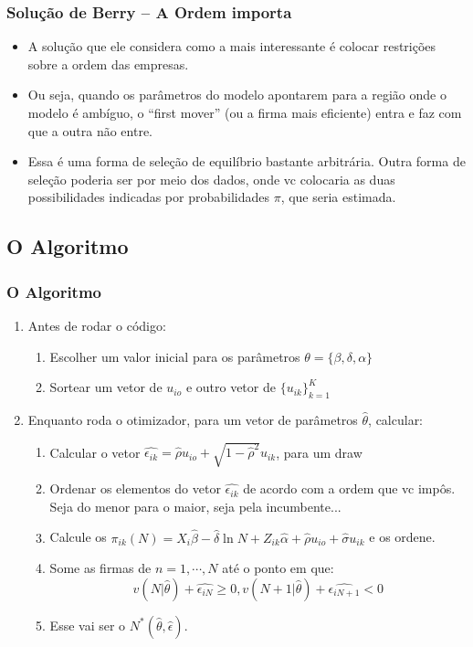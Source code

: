 \documentclass{beamer}
\begin{document}
\begin{frame}[fragile]\frametitle{Solução de Berry -- A Ordem importa}
    
    \begin{itemize}
        \item A solução que ele considera como a mais interessante é colocar restrições sobre a ordem das empresas.
        \item Ou seja, quando os parâmetros do modelo apontarem para a região onde o modelo é ambíguo, o ``first mover'' (ou a firma mais eficiente) entra e faz com que a outra não entre.
        \item Essa é uma forma de seleção de equilíbrio bastante arbitrária. Outra forma de seleção poderia ser por meio dos dados, onde vc colocaria as duas possibilidades indicadas por probabilidades $\pi$, que seria estimada.
    \end{itemize}


\end{frame}

\subsection{O Algoritmo}

\begin{frame}[fragile]\frametitle{O Algoritmo}
    
    \begin{enumerate}
        \item Antes de rodar o código:
        \begin{enumerate}
            \item Escolher um valor inicial para os parâmetros $\theta=\{\beta, \delta, \alpha\}$
            \item Sortear um vetor de $u_{io}$ e outro vetor de $\{u_{ik}\}_{k=1}^{K}$
        \end{enumerate}
        \item Enquanto roda o otimizador, para um vetor de parâmetros $\hat{\theta}$, calcular:
        \begin{enumerate}
            \item Calcular o vetor $\hat{\epsilon_{ik}}=\hat{\rho} u_{io}+ \sqrt{1-\hat{\rho}^2} u_{ik}$, para um draw
            \item Ordenar os elementos do vetor $\hat{\epsilon_{ik}}$ de acordo com a ordem que vc impôs. Seja do menor para o maior, seja pela incumbente...
            \item Calcule os $\pi_{ik}(N)=X_{i}\hat{\beta} - \hat{\delta} \ln{N} + Z_{ik} \hat{\alpha} +\hat{\rho} u_{io} + \hat{\sigma} u_{ik}$ e os ordene. 
            \item Some as firmas de $n=1,\cdots,N$ até o ponto em que:
            \[
            v(N|\hat{\theta})+\hat{\epsilon_{iN}}\geq 0, v(N+1|\hat{\theta})+\hat{\epsilon_{iN+1}}< 0
            \]
            \item Esse vai ser o $N^{*}(\hat{\theta},\hat{\epsilon})$.
        \end{enumerate}
    \end{enumerate}

\end{frame}
\end{document}

